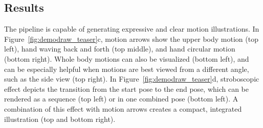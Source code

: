 
\subsection{Results}
The \systemname{} pipeline is capable of generating expressive and clear motion illustrations. In Figure~\ref{fig:demodraw_teaser}c, motion arrows show the upper body motion (top left), hand waving back and forth (top middle), and hand circular motion (bottom right). Whole body motions can also be visualized (bottom left), and can be especially helpful when motions are best viewed from a different angle, such as the side view (top right).
%
In Figure~\ref{fig:demodraw_teaser}d, stroboscopic effect depicts the transition from the start pose to the end pose, which can be rendered as a sequence (top left) or in one combined pose (bottom left). A combination of this effect with motion arrows creates a compact, integrated illustration (top and bottom right).




